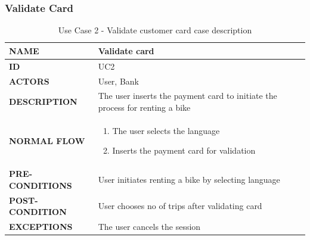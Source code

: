 \subsubsection{Validate Card}
\begin{table}[H]
\begin{center}
\renewcommand{\arraystretch}{2}
\begin{tabular}{|p{8cm}|p{8cm}| } 
 \hline
 \textbf{NAME} & Validate card\\ 
 \hline
 \textbf{ID} & UC2  \\ 
 \hline
 \textbf{ACTORS} & User, Bank\\ 
 \hline
 \textbf{DESCRIPTION} & The user inserts the payment card to initiate the process for renting a bike \\ 
 \hline
 \textbf{NORMAL FLOW} & \begin{enumerate}
     \item The user selects the language
     \item Inserts the payment card for validation
 \end{enumerate} \\
 \hline
 \textbf{PRE-CONDITIONS} & User initiates renting a bike by selecting language\\
 \hline
 \textbf{POST-CONDITION} & User chooses no of trips after validating card\\
 \hline
 \textbf{EXCEPTIONS} & The user cancels the session\\
 \hline
\end{tabular}
\caption{\label{demo-table}Use Case 2 - Validate customer card case description}
\end{center}
\end{table}


